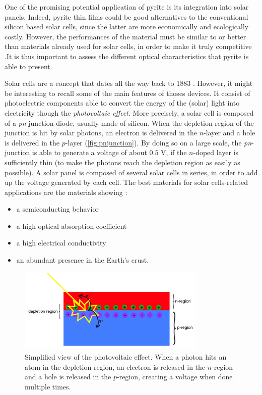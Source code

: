\documentclass[11pt,a4paper]{article}
\begin{document}
One of the promising potential application of pyrite is its integration into solar panels. Indeed, pyrite thin films could be good alternatives to the conventional silicon based solar cells, since the latter are more economically and ecologically costly. However, the performances of the material must be similar to or better than materials already used for solar cells, in order to make it truly competitive \cite{pyriteSolarCells}.It is thus important to assess the different optical characteristics that pyrite is able to present. 

Solar cells are a concept that dates all the way back to 1883 \cite{solarcellinvention}. However, it might be interesting to recall some of the main features of thoses devices. It consist of photoelectric components able to convert the energy of the (solar) light into electricity though the \textit{photovoltaic effect}. More precisely, a solar cell is composed of a \textit{pn}-junction diode, usually made of silicon. When the depletion region of the junction is hit by solar photons, an electron is delivered in the $n$-layer and a hole is delivered in the $p$-layer (\autoref{fig:pnjunction}). By doing so on a large scale, the \textit{pn}-junction is able to generate a voltage of about $0.5$ V, if the $n$-doped layer is sufficiently thin (to make the photons reach the depletion region as easily as possible). A solar panel is composed of several solar cells in series, in order to add up the voltage generated by each cell. The best materials for solar cells-related applications are the materials showing :
\begin{itemize}
\item a semiconducting behavior
\item a high optical absorption coefficient
\item a high electrical conductivity
\item an abundant presence in the Earth's crust.\cite{solarCell}
\end{itemize}
\begin{figure}[H]
\centering
\includegraphics[width=0.8\textwidth]{images/pnjunction.png}
\caption{Simplified view of the photovoltaic effect. When a photon hits an atom in the depletion region, an electron is released in the $n$-region and a hole is released in the $p$-region, creating a voltage when done multiple times.}
\label{fig:pnjunction}
\end{figure}
\end{document}
